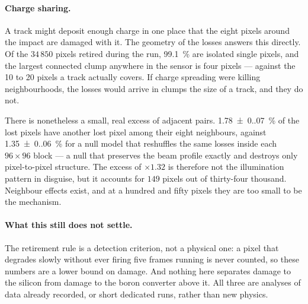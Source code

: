 \documentclass[a4paper,headsepline,oneside,11pt]{scrartcl}
\begin{document}
\paragraph{Charge sharing.} A track might deposit enough charge in one place
that the eight pixels around the impact are damaged with it. The geometry of the losses answers this directly.
Of the $34\,850$ pixels retired during the run, \SI{99.1}{\percent} are isolated single
pixels, and the largest connected clump anywhere in the sensor is four pixels
--- against the 10 to 20 pixels a track actually covers. If charge spreading
were killing neighbourhoods, the losses would arrive in clumps the size of a
track, and they do not.

There is nonetheless a small, real excess of adjacent pairs. \SI{1.78(0.07)}{\percent} of the lost pixels have another lost pixel among their
eight neighbours, against \SI{1.35(0.06)}{\percent} for a null model that reshuffles the same losses inside each
$96\times96$ block --- a null that preserves the beam profile exactly and
destroys only pixel-to-pixel structure. The excess of $\times 1.32$ is therefore
not the illumination pattern in disguise, but it accounts for $149$ pixels out
of thirty-four thousand. Neighbour effects exist, and at a hundred and fifty
pixels they are too small to be the mechanism.

\paragraph{What this still does not settle.} The retirement rule is a detection
criterion, not a physical one: a pixel that degrades slowly without ever firing
five frames running is never counted, so these numbers are a lower bound on
damage. And nothing here separates damage to the silicon from damage to the boron
converter above it. All three are analyses of data already recorded, or short
dedicated runs, rather than new physics.
\end{document}
